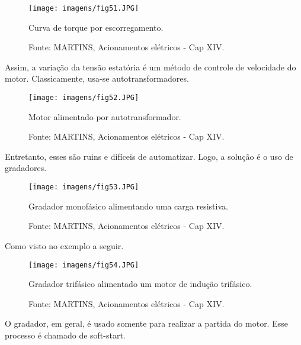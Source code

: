 \begin{figure}[ht!]
\center
\texttt{[image: imagens/fig51.JPG]}
\caption{\label{fig:fig51} Curva de torque por escorregamento.}
\caption*{Fonte: MARTINS, Acionamentos elétricos - Cap XIV.}
\end{figure}

Assim, a variação da tensão estatória é um método de controle de velocidade do motor. Classicamente, usa-se autotransformadores.

\begin{figure}[ht!]
\center
\texttt{[image: imagens/fig52.JPG]}
\caption{\label{fig:fig52} Motor alimentado por autotransformador.}
\caption*{Fonte: MARTINS, Acionamentos elétricos - Cap XIV.}
\end{figure}

Entretanto, esses são ruins e difíceis de automatizar. Logo, a solução é o uso de gradadores.

\begin{figure}[ht!]
\center
\texttt{[image: imagens/fig53.JPG]}
\caption{\label{fig:fig53} Gradador monofásico alimentando uma carga resistiva.}
\caption*{Fonte: MARTINS, Acionamentos elétricos - Cap XIV.}
\end{figure}

Como visto no exemplo a seguir.

\begin{figure}[ht!]
\center
\texttt{[image: imagens/fig54.JPG]}
\caption{\label{fig:fig54} Gradador trifásico alimentado um motor de indução trifásico.}
\caption*{Fonte: MARTINS, Acionamentos elétricos - Cap XIV.}
\end{figure}

O gradador, em geral, é usado somente para realizar a partida do motor. Esse processo é chamado de soft-start.


